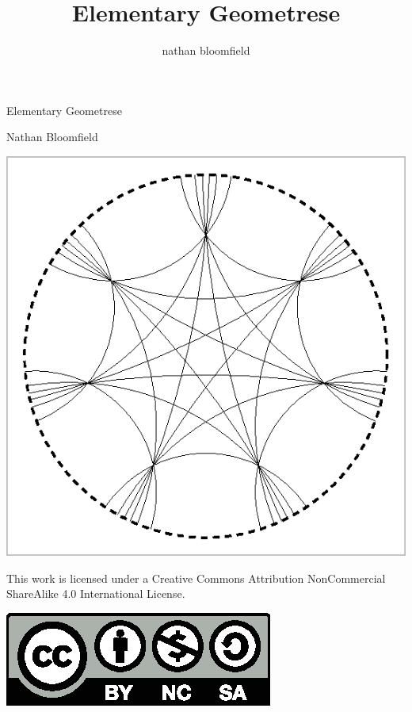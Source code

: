 \documentclass{memoir}
\begin{document}
\title{Elementary Geometrese}
\author{nathan bloomfield}


\frontmatter

\thispagestyle{empty}

\begin{center}
{\Large Elementary Geometrese}

\vspace{1cm}

Nathan Bloomfield

\vspace{3cm}

\includegraphics[scale=1.8,trim=4 4 4 4,clip]{src/geo/gfx/cover/cover.eps}
\end{center}

\newpage
\tableofcontents

\setcounter{page}{0}

\begin{center}
\begin{minipage}{0.8\textwidth}
\begin{center}
\vspace{40pt}

This work is licensed under a Creative Commons Attribution NonCommercial ShareAlike 4.0 International License.

\vspace{12pt}

\includegraphics[scale=0.8]{src/geo/gfx/by-nc-sa.eps}
\end{center}
\end{minipage}
\end{center}
\newpage
\end{document}
